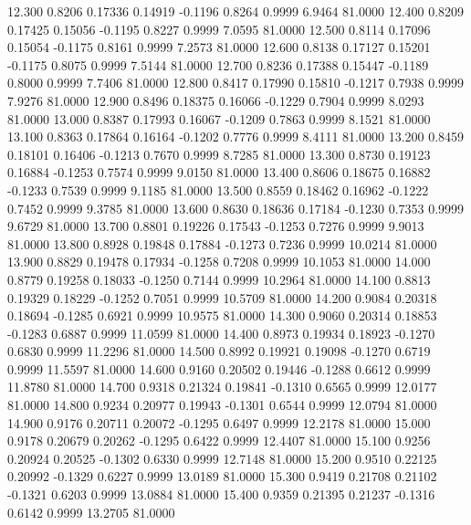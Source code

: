   12.300   0.8206   0.17336   0.14919  -0.1196   0.8264   0.9999   6.9464  81.0000
  12.400   0.8209   0.17425   0.15056  -0.1195   0.8227   0.9999   7.0595  81.0000
  12.500   0.8114   0.17096   0.15054  -0.1175   0.8161   0.9999   7.2573  81.0000
  12.600   0.8138   0.17127   0.15201  -0.1175   0.8075   0.9999   7.5144  81.0000
  12.700   0.8236   0.17388   0.15447  -0.1189   0.8000   0.9999   7.7406  81.0000
  12.800   0.8417   0.17990   0.15810  -0.1217   0.7938   0.9999   7.9276  81.0000
  12.900   0.8496   0.18375   0.16066  -0.1229   0.7904   0.9999   8.0293  81.0000
  13.000   0.8387   0.17993   0.16067  -0.1209   0.7863   0.9999   8.1521  81.0000
  13.100   0.8363   0.17864   0.16164  -0.1202   0.7776   0.9999   8.4111  81.0000
  13.200   0.8459   0.18101   0.16406  -0.1213   0.7670   0.9999   8.7285  81.0000
  13.300   0.8730   0.19123   0.16884  -0.1253   0.7574   0.9999   9.0150  81.0000
  13.400   0.8606   0.18675   0.16882  -0.1233   0.7539   0.9999   9.1185  81.0000
  13.500   0.8559   0.18462   0.16962  -0.1222   0.7452   0.9999   9.3785  81.0000
  13.600   0.8630   0.18636   0.17184  -0.1230   0.7353   0.9999   9.6729  81.0000
  13.700   0.8801   0.19226   0.17543  -0.1253   0.7276   0.9999   9.9013  81.0000
  13.800   0.8928   0.19848   0.17884  -0.1273   0.7236   0.9999  10.0214  81.0000
  13.900   0.8829   0.19478   0.17934  -0.1258   0.7208   0.9999  10.1053  81.0000
  14.000   0.8779   0.19258   0.18033  -0.1250   0.7144   0.9999  10.2964  81.0000
  14.100   0.8813   0.19329   0.18229  -0.1252   0.7051   0.9999  10.5709  81.0000
  14.200   0.9084   0.20318   0.18694  -0.1285   0.6921   0.9999  10.9575  81.0000
  14.300   0.9060   0.20314   0.18853  -0.1283   0.6887   0.9999  11.0599  81.0000
  14.400   0.8973   0.19934   0.18923  -0.1270   0.6830   0.9999  11.2296  81.0000
  14.500   0.8992   0.19921   0.19098  -0.1270   0.6719   0.9999  11.5597  81.0000
  14.600   0.9160   0.20502   0.19446  -0.1288   0.6612   0.9999  11.8780  81.0000
  14.700   0.9318   0.21324   0.19841  -0.1310   0.6565   0.9999  12.0177  81.0000
  14.800   0.9234   0.20977   0.19943  -0.1301   0.6544   0.9999  12.0794  81.0000
  14.900   0.9176   0.20711   0.20072  -0.1295   0.6497   0.9999  12.2178  81.0000
  15.000   0.9178   0.20679   0.20262  -0.1295   0.6422   0.9999  12.4407  81.0000
  15.100   0.9256   0.20924   0.20525  -0.1302   0.6330   0.9999  12.7148  81.0000
  15.200   0.9510   0.22125   0.20992  -0.1329   0.6227   0.9999  13.0189  81.0000
  15.300   0.9419   0.21708   0.21102  -0.1321   0.6203   0.9999  13.0884  81.0000
  15.400   0.9359   0.21395   0.21237  -0.1316   0.6142   0.9999  13.2705  81.0000
